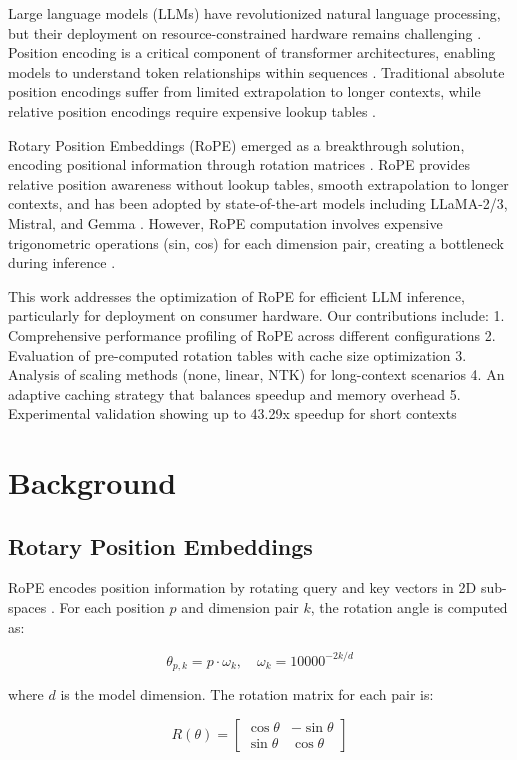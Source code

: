\documentclass[conference]{IEEEtran}
\begin{document}
Large language models (LLMs) have revolutionized natural language processing, but their deployment on resource-constrained hardware remains challenging \cite{touvron2023}. Position encoding is a critical component of transformer architectures, enabling models to understand token relationships within sequences \cite{vaswani2017}. Traditional absolute position encodings suffer from limited extrapolation to longer contexts, while relative position encodings require expensive lookup tables \cite{shaw2023}.

Rotary Position Embeddings (RoPE) emerged as a breakthrough solution, encoding positional information through rotation matrices \cite{su2021}. RoPE provides relative position awareness without lookup tables, smooth extrapolation to longer contexts, and has been adopted by state-of-the-art models including LLaMA-2/3, Mistral, and Gemma \cite{touvron2023}. However, RoPE computation involves expensive trigonometric operations (sin, cos) for each dimension pair, creating a bottleneck during inference \cite{chen2024}.

This work addresses the optimization of RoPE for efficient LLM inference, particularly for deployment on consumer hardware. Our contributions include:
1. Comprehensive performance profiling of RoPE across different configurations
2. Evaluation of pre-computed rotation tables with cache size optimization
3. Analysis of scaling methods (none, linear, NTK) for long-context scenarios
4. An adaptive caching strategy that balances speedup and memory overhead
5. Experimental validation showing up to 43.29x speedup for short contexts

\section{Background}

\subsection{Rotary Position Embeddings}

RoPE encodes position information by rotating query and key vectors in 2D sub-spaces \cite{su2021}. For each position $p$ and dimension pair $k$, the rotation angle is computed as:

\[
\theta_{p,k} = p \cdot \omega_k, \quad \omega_k = 10000^{-2k/d}
\]

where $d$ is the model dimension. The rotation matrix for each pair is:

\[
R(\theta) = \begin{bmatrix} \cos\theta & -\sin\theta \\ \sin\theta & \cos\theta \end{bmatrix}
\]
\end{document}
